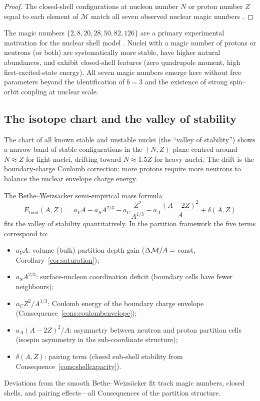\begin{proof}
The closed-shell configurations at nucleon number $N$ or proton number $Z$
equal to each element of $\mathcal{M}$ match all seven observed nuclear magic
numbers \citep{krane1988}.
\end{proof}

\begin{remark}
The magic numbers $\{2,8,20,28,50,82,126\}$ are a primary experimental
motivation for the nuclear shell model \citep{mayer1949,haxeljensensuess1949}.
Nuclei with a magic number of protons or neutrons (or both) are systematically
more stable, have higher natural abundances, and exhibit closed-shell features
(zero quadrupole moment, high first-excited-state energy).  All seven magic
numbers emerge here without free parameters beyond the identification of
$b=3$ and the existence of strong spin--orbit coupling at nuclear scale.
\end{remark}

\subsection{The isotope chart and the valley of stability}
\label{subsec:isotopechart}

The chart of all known stable and unstable nuclei (the ``valley of stability'')
shows a narrow band of stable configurations in the $(N,Z)$ plane centred
around $N\approx Z$ for light nuclei, drifting toward $N\approx 1.5Z$ for
heavy nuclei.  The drift is the boundary-charge Coulomb correction: more
protons require more neutrons to balance the nuclear envelope charge energy.

The Bethe--Weizs\"acker semi-empirical mass formula
\[
  E_{\mathrm{bind}}(A,Z)
  = a_{V}A - a_{S}A^{2/3} - a_{C}\frac{Z^{2}}{A^{1/3}}
    - a_{A}\frac{(A-2Z)^{2}}{A} + \delta(A,Z)
\]
fits the valley of stability quantitatively.  In the partition framework the
five terms correspond to:
\begin{itemize}
  \item $a_{V}A$: volume (bulk) partition depth gain ($\Delta\mathcal{M}/A=$ const,
    Corollary~\ref{cor:saturation});
  \item $a_{S}A^{2/3}$: surface-nucleon coordination deficit (boundary cells
    have fewer neighbours);
  \item $a_{C}Z^{2}/A^{1/3}$: Coulomb energy of the boundary charge envelope
    (Consequence~\ref{cons:coulombenvelope});
  \item $a_{A}(A-2Z)^{2}/A$: asymmetry between neutron and proton partition
    cells (isospin asymmetry in the sub-coordinate structure);
  \item $\delta(A,Z)$: pairing term (closed sub-shell stability from
    Consequence~\ref{cons:shellcapacity}).
\end{itemize}
Deviations from the smooth Bethe--Weizs\"acker fit track magic numbers, closed
shells, and pairing effects---all Consequences of the partition structure.

